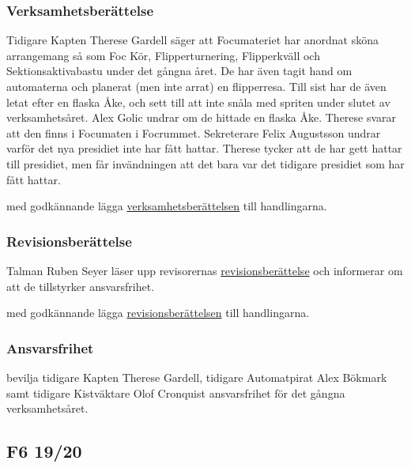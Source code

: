 \documentclass[hidelinks]{../sektionsmote} %
\begin{document}
\subsubsection{Verksamhetsberättelse}
Tidigare Kapten Therese Gardell säger att Focumateriet har anordnat sköna arrangemang så som Foc Kör, Flipperturnering, Flipperkväll och Sektionsaktivabastu under det gångna året.
De har även tagit hand om automaterna och planerat (men inte arrat) en flipperresa.
Till sist har de även letat efter en flaska Åke, och sett till att inte snåla med spriten under slutet av verksamhetsåret.
Alex Golic undrar om de hittade en flaska Åke.
Therese svarar att den finns i Focumaten i Focrummet.
Sekreterare Felix Augustsson undrar varför det nya presidiet inte har fått hattar.
Therese tycker att de har gett hattar till presidiet, men får invändningen att det bara var det tidigare presidiet som har fått hattar.
\begin{beslut}
    \item med godkännande lägga \hyperlink{bilagor/foc/vb.pdf.1}{verksamhetsberättelsen} till handlingarna.
\end{beslut}

\subsubsection{Revisionsberättelse}
Talman Ruben Seyer läser upp revisorernas \hyperlink{bilagor/foc/rb.pdf.1}{revisionsberättelse} och informerar om att de tillstyrker ansvarsfrihet.
\begin{beslut}
    \item med godkännande lägga \hyperlink{bilagor/foc/rb.pdf.1}{revisionsberättelsen} till handlingarna.
\end{beslut}

\subsubsection{Ansvarsfrihet}
\begin{beslut}
    \item bevilja tidigare Kapten Therese Gardell, tidigare Automatpirat Alex Bökmark samt tidigare Kistväktare Olof Cronquist ansvarsfrihet för det gångna verksamhetsåret.
\end{beslut}

\subsection{F6 19/20}
\end{document}
